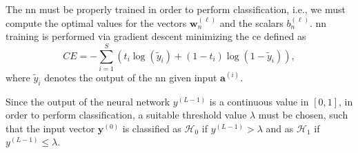 \documentclass[twocolumns]{IEEEtran}
\begin{document}
The \ac{nn} must be properly trained in order to perform classification, i.e., we must compute the optimal values for the vectors $\bm{w}_n^{(\ell)}$ and the scalars $b_n^{(\ell)}$. \ac{nn} training is performed via gradient descent minimizing the \ac{ce} defined as
\begin{equation}\label{eq:ce}
CE = -\sum_{i=1}^{S}\left(t_i\log\left(\tilde{y}_i\right)+\left(1-t_i\right)\log\left(1-\tilde{y}_i\right) \right),
\end{equation}
where $\tilde{y}_i$ denotes the output of the \ac{nn} given input $\bm{a}^{(i)}$.

Since the output of the neural network $y^{(L-1)}$ is a continuous value in $[0,1]$, in order to perform classification, a suitable threshold value $\lambda$ must be chosen, such that the input vector $\bm{y}^{(0)}$ is classified as
$\mathcal{H}_0$ if $y^{(L-1)} > \lambda$ and as $\mathcal{H}_1$ if $y^{(L-1)} \le \lambda$.

\end{document}
